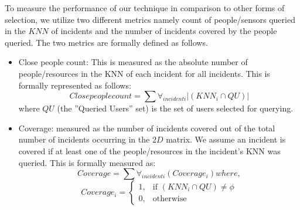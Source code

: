 \documentclass{acm_proc_article-sp}
\begin{document}
 To measure the performance of our technique in comparison to other forms of selection, we utilize two different metrics namely count of people/sensors queried in the $KNN$ of incidents and the number of incidents covered by the people queried. The two metrics are formally defined as follows.
 \begin{itemize}
 \item Close people count: This is measured as the absolute number of people/resources in the KNN of each incident for all incidents. This is formally represented as follows:
 \begin{equation}
 Close people count = \sum \forall_{incident i} |(KNN_i \cap {QU})|
 \end{equation}
 where $QU$ (the ''Queried Users'' set) is the set of users selected for querying. 
 \item Coverage: measured as the number of incidents covered out of the total number of incidents occurring in the $2D$ matrix. We assume an incident is covered if at least one of the people/resources in the incident's KNN was queried. This is formally measured as:
 \begin{equation}
Coverage = \sum \forall_{incident i} (Coverage_i) where,
 \end{equation}
 \[
    Coverage_i = 
\begin{cases}
    1,& \text{if }(KNN_i \cap {QU}) \neq \phi\\
    0,              & \text{otherwise}
\end{cases}
\]
\end{itemize}  
\end{document}
